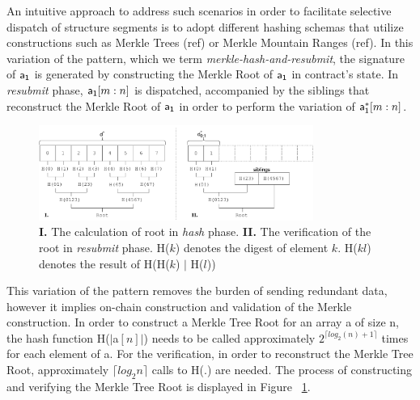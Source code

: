 An intuitive approach to address such scenarios in order to facilitate
selective dispatch of structure segments is to adopt different hashing schemas
that utilize constructions such as Merkle Trees (ref) or Merkle Mountain Ranges
(ref). In this variation of the pattern, which we term
\emph{merkle-hash-and-resubmit}, the signature of $\mathsf{a_1}$ is generated by
constructing the Merkle Root of $\mathsf{a_1}$ in contract's state. In \emph{resubmit}
phase, $\mathsf{a_1}[m:n]$ is dispatched, accompanied by the siblings that reconstruct
the Merkle Root of $\mathsf{a_1}$ in order to perform the variation of $\mathsf{a_1^*}[m:n]$.

\begin{figure}[h]
    \begin{center}
        \includegraphics[width=0.8\textwidth]{figures/merkle-har.pdf}
    \end{center}
    \caption{\textbf{I.} The calculation of root in \emph{hash} phase.
    \textbf{II.} The verification of the root in \emph{resubmit} phase.
    \textsf{H}($k$) denotes the digest of element $k$. \textsf{H}($kl$) denotes the
    result of \textsf{H}(\textsf{H}($k$) $|$ \textsf{H}($l$))
}
    \label{fig:merkle-har}
\end{figure}

This variation of the pattern removes the burden of sending redundant data,
however it implies on-chain construction and validation of the Merkle
construction. In order to construct a Merkle Tree Root for an array \textsf{a}
of size \textsf{n}, the hash function \textsf{H}($|$\textsf{a}$[n]|$) needs to
be called approximately $2^{\lceil log_2(n) + 1 \rceil}$ times for each element
of \textsf{a}. For the verification, in order to reconstruct the Merkle Tree
Root, approximately $\lceil log_2{n} \rceil$ calls to \textsf{H}(.) are needed.
The process of constructing and verifying the Merkle Tree Root is displayed in
Figure ~\ref{fig:merkle-har}.

